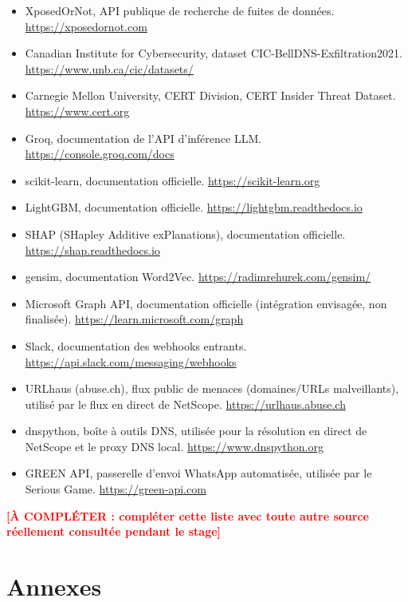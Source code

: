 \documentclass[12pt,a4paper]{report}
\newcommand{\TODO}[1]{\textcolor{red}{\textbf{[À COMPLÉTER : #1]}}}
\begin{document}
\begin{itemize}[nosep]
\item XposedOrNot, API publique de recherche de fuites de données. \url{https://xposedornot.com}
\item Canadian Institute for Cybersecurity, dataset CIC-BellDNS-Exfiltration2021. \url{https://www.unb.ca/cic/datasets/}
\item Carnegie Mellon University, CERT Division, CERT Insider Threat Dataset. \url{https://www.cert.org}
\item Groq, documentation de l'API d'inférence LLM. \url{https://console.groq.com/docs}
\item scikit-learn, documentation officielle. \url{https://scikit-learn.org}
\item LightGBM, documentation officielle. \url{https://lightgbm.readthedocs.io}
\item SHAP (SHapley Additive exPlanations), documentation officielle. \url{https://shap.readthedocs.io}
\item gensim, documentation Word2Vec. \url{https://radimrehurek.com/gensim/}
\item Microsoft Graph API, documentation officielle (intégration envisagée, non finalisée). \url{https://learn.microsoft.com/graph}
\item Slack, documentation des webhooks entrants. \url{https://api.slack.com/messaging/webhooks}
\item URLhaus (abuse.ch), flux public de menaces (domaines/URLs malveillants), utilisé par le flux en direct de NetScope. \url{https://urlhaus.abuse.ch}
\item dnspython, boîte à outils DNS, utilisée pour la résolution en direct de NetScope et le proxy DNS local. \url{https://www.dnspython.org}
\item GREEN API, passerelle d'envoi WhatsApp automatisée, utilisée par le Serious Game. \url{https://green-api.com}
\end{itemize}

\TODO{compléter cette liste avec toute autre source réellement consultée pendant le stage}

\appendix
\chapter*{Annexes}
\end{document}
